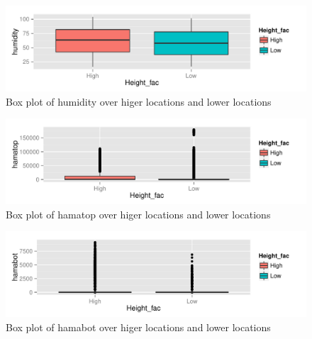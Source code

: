 \documentclass{article}\usepackage[]{graphicx}\usepackage[]{color}
\makeatletter
\def\maxwidth{ %
  \ifdim\Gin@nat@width>\linewidth
    \linewidth
  \else
    \Gin@nat@width
  \fi
}
\newenvironment{knitrout}{}{} %
\makeatother
\begin{document}
\begin{knitrout}
\color{fgcolor}\begin{figure}[h!]

{\centering \includegraphics[width=\maxwidth]{figure/addfigure22-1} 

}

\caption[Box plot of humidity over higer locations and lower locations]{Box plot of humidity over higer locations and lower locations}\label{fig:addfigure22}
\end{figure}


\end{knitrout}

\begin{knitrout}
\color{fgcolor}\begin{figure}[h!]

{\centering \includegraphics[width=\maxwidth]{figure/addfigure23-1} 

}

\caption[Box plot of hamatop over higer locations and lower locations]{Box plot of hamatop over higer locations and lower locations}\label{fig:addfigure23}
\end{figure}


\end{knitrout}

\begin{knitrout}
\color{fgcolor}\begin{figure}[h!]

{\centering \includegraphics[width=\maxwidth]{figure/addfigure24-1} 

}

\caption[Box plot of hamabot over higer locations and lower locations]{Box plot of hamabot over higer locations and lower locations}\label{fig:addfigure24}
\end{figure}


\end{knitrout}
\end{document}
